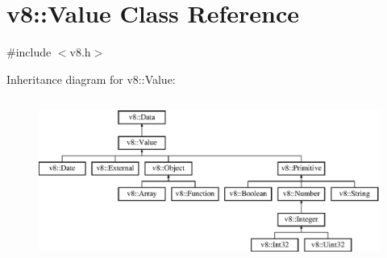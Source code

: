 \hypertarget{classv8_1_1_value}{}\section{v8\+:\+:Value Class Reference}
\label{classv8_1_1_value}


{\ttfamily \#include $<$v8.\+h$>$}

Inheritance diagram for v8\+:\+:Value\+:\begin{figure}[H]
\begin{center}
\leavevmode
\includegraphics[height=5.393259cm]{classv8_1_1_value}
\end{center}
\end{figure}
